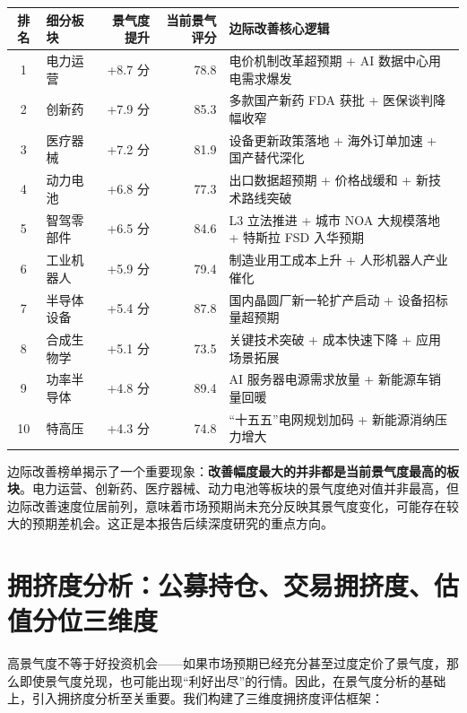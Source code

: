\begin{exhibitbox}
\centering
\small
\renewcommand{\arraystretch}{1.2}
\renewcommand{\tabularxcolumn}[1]{m{#1}}
\begin{tabularx}{\textwidth}{@{}c l r r X@{}}
\toprule
\textbf{排名} & \textbf{细分板块} & \textbf{景气度提升} & \textbf{当前景气评分} & \textbf{边际改善核心逻辑} \\
\midrule
1 & 电力运营 & +8.7 分 & 78.8 & 电价机制改革超预期 + AI 数据中心用电需求爆发 \\
2 & 创新药 & +7.9 分 & 85.3 & 多款国产新药 FDA 获批 + 医保谈判降幅收窄 \\
3 & 医疗器械 & +7.2 分 & 81.9 & 设备更新政策落地 + 海外订单加速 + 国产替代深化 \\
4 & 动力电池 & +6.8 分 & 77.3 & 出口数据超预期 + 价格战缓和 + 新技术路线突破 \\
5 & 智驾零部件 & +6.5 分 & 84.6 & L3 立法推进 + 城市 NOA 大规模落地 + 特斯拉 FSD 入华预期 \\
6 & 工业机器人 & +5.9 分 & 79.4 & 制造业用工成本上升 + 人形机器人产业催化 \\
7 & 半导体设备 & +5.4 分 & 87.8 & 国内晶圆厂新一轮扩产启动 + 设备招标量超预期 \\
8 & 合成生物学 & +5.1 分 & 73.5 & 关键技术突破 + 成本快速下降 + 应用场景拓展 \\
9 & 功率半导体 & +4.8 分 & 89.4 & AI 服务器电源需求放量 + 新能源车销量回暖 \\
10 & 特高压 & +4.3 分 & 74.8 & ``十五五''电网规划加码 + 新能源消纳压力增大 \\
\bottomrule
\end{tabularx}
\vspace{0.2cm}
\end{exhibitbox}

边际改善榜单揭示了一个重要现象：\textbf{改善幅度最大的并非都是当前景气度最高的板块}。电力运营、创新药、医疗器械、动力电池等板块的景气度绝对值并非最高，但边际改善速度位居前列，意味着市场预期尚未充分反映其景气度变化，可能存在较大的预期差机会。这正是本报告后续深度研究的重点方向。

\section{拥挤度分析：公募持仓、交易拥挤度、估值分位三维度}

高景气度不等于好投资机会——如果市场预期已经充分甚至过度定价了景气度，那么即使景气度兑现，也可能出现``利好出尽''的行情。因此，在景气度分析的基础上，引入拥挤度分析至关重要。我们构建了三维度拥挤度评估框架：


